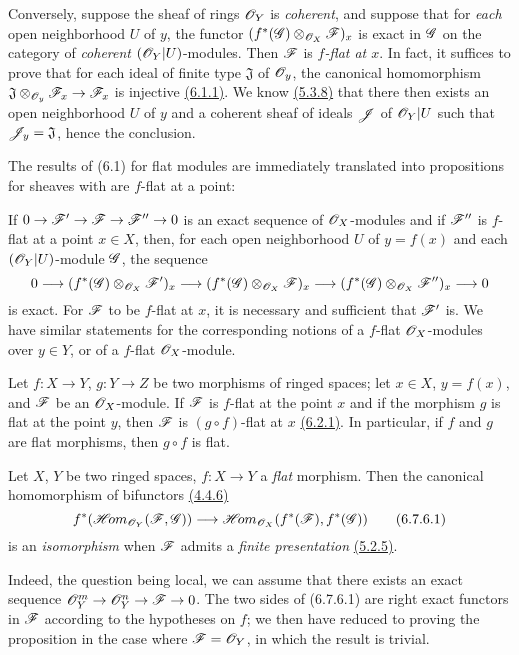 \begin{env}[6.7.3]
\label{0.6.7.3}
Conversely, suppose the sheaf of rings $\mathscr{O}_Y$ is {\em coherent}, and suppose that for
{\em each} open neighborhood $U$ of $y$, the functor $(f^*(\mathscr{G})\otimes_{\mathscr{O}_X}\mathscr{F})_x$
is exact in $\mathscr{G}$ on the category of {\em coherent} $(\mathscr{O}_Y|U)$-modules. Then $\mathscr{F}$ is
{\em $f$-flat at $x$}. In fact, it suffices to prove that for each ideal of finite type
$\mathfrak{J}$ of $\mathscr{O}_y$, the canonical homomorphism
$\mathfrak{J}\otimes_{\mathscr{O}_y}\mathscr{F}_x\to\mathscr{F}_x$ is injective \hyperref[0.6.1.1]{(6.1.1)}. We know
\hyperref[0.5.3.8]{(5.3.8)} that there then exists an open neighborhood
$U$ of $y$ and a coherent sheaf of ideals $\mathscr{J}$ of $\mathscr{O}_Y|U$ such that
$\mathscr{J}_y=\mathfrak{J}$, hence the conclusion.
\end{env}

\begin{env}[6.7.4]
\label{0.6.7.4}
The results of (6.1) for flat modules are immediately translated into propositions for
sheaves with are $f$-flat at a point:

If $0\to\mathscr{F}'\to\mathscr{F}\to\mathscr{F}''\to 0$ is an exact sequence of $\mathscr{O}_X$-modules and if
$\mathscr{F}''$ is $f$-flat at a point $x\in X$, then, for each open neighborhood $U$ of $y=f(x)$
and each $(\mathscr{O}_Y|U)$-module $\mathscr{G}$, the sequence
\[
  0\longrightarrow(f^*(\mathscr{G})\otimes_{\mathscr{O}_X}\mathscr{F}')_x
  \longrightarrow(f^*(\mathscr{G})\otimes_{\mathscr{O}_X}\mathscr{F})_x
  \longrightarrow(f^*(\mathscr{G})\otimes_{\mathscr{O}_X}\mathscr{F}'')_x\longrightarrow 0
\]
is exact. For $\mathscr{F}$ to be $f$-flat at $x$, it is necessary and sufficient that $\mathscr{F}'$
is. We have similar statements for the corresponding notions of a $f$-flat $\mathscr{O}_X$-modules
over $y\in Y$, or of a $f$-flat $\mathscr{O}_X$-module.
\end{env}

\begin{env}[6.7.5]
\label{0.6.7.5}
Let $f:X\to Y$, $g:Y\to Z$ be two morphisms of ringed spaces; let $x\in X$, $y=f(x)$, and
$\mathscr{F}$ be an $\mathscr{O}_X$-module. If $\mathscr{F}$ is $f$-flat at the point $x$ and if the morphism
$g$ is flat at the point $y$, then $\mathscr{F}$ is $(g\circ f)$-flat at $x$ \hyperref[0.6.2.1]{(6.2.1)}. In
particular, if $f$ and $g$ are flat morphisms, then $g\circ f$ is flat.
\end{env}

\begin{env}[6.7.6]
\label{0.6.7.6}
Let $X$, $Y$ be two ringed spaces, $f:X\to Y$ a {\em flat} morphism. Then the canonical
homomorphism of bifunctors \hyperref[0.4.4.6]{(4.4.6)}
\[
  f^*(\mathscr{H}\!{om}_{\mathscr{O}_Y}(\mathscr{F},\mathscr{G}))\longrightarrow\mathscr{H}\!{om}_{\mathscr{O}_X}(f^*(\mathscr{F}),f^*(\mathscr{G}))
  \tag{6.7.6.1}
\]
is an {\em isomorphism} when $\mathscr{F}$ admits a {\em finite presentation} \hyperref[0.5.2.5]{(5.2.5)}.

Indeed, the question being local, we can assume that there exists an exact sequence
$\mathscr{O}_Y^m\to\mathscr{O}_Y^n\to\mathscr{F}\to 0$. The two sides of (6.7.6.1) are right exact functors in
$\mathscr{F}$ according to the hypotheses on $f$; we then have reduced to proving the proposition
in the case where $\mathscr{F}=\mathscr{O}_Y$, in which the result is trivial.
\end{env}

